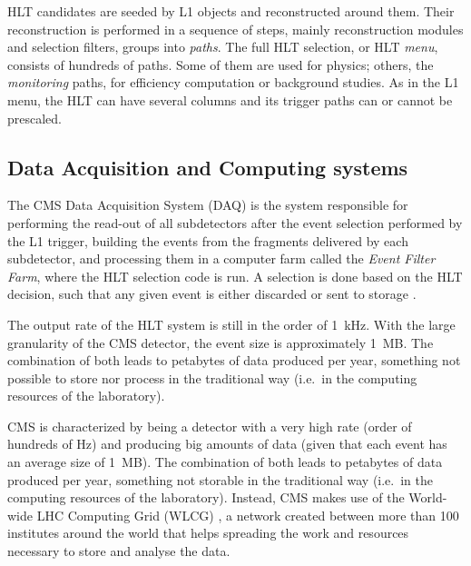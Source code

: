 \documentclass[../main.tex]{subfiles}
\begin{document}
HLT candidates are seeded by L1 objects and reconstructed around them. Their reconstruction is performed in a sequence of steps, mainly reconstruction modules and selection filters, groups into \textit{paths}. The full HLT selection, or HLT \textit{menu}, consists of hundreds of paths. Some of them are used for physics; others, the \textit{monitoring} paths, for efficiency computation or background studies. As in the L1 menu, the HLT can have several columns and its trigger paths can or cannot be prescaled.

\subsection{Data Acquisition and Computing systems}


The CMS Data Acquisition System (DAQ) is the system responsible for performing the read-out of all subdetectors after the event selection performed by the L1 trigger, building the events from the fragments delivered by each subdetector, and processing them in a computer farm called the \textit{Event Filter Farm}, where the HLT selection code is run. A selection is done based on the HLT decision, such that any given event is either discarded or sent to storage \cite{intro:exp:cms}.

The output rate of the HLT system is still in the order of 1~kHz. With the large granularity of the CMS detector, the event size is approximately 1~MB. The combination of both leads to petabytes of data produced per year, something not possible to store nor process in the traditional way (i.e.~in the computing resources of the laboratory).


CMS is characterized by being a detector with a very high rate (order of hundreds of Hz) and producing big amounts of data (given that each event has an average size of 1~MB). The combination of both leads to petabytes of data produced per year, something not storable in the traditional way (i.e.~in the computing resources of the laboratory). Instead, CMS makes use of the World-wide LHC Computing Grid (WLCG) \cite{intro:exp:wlcg_1, intro:exp:wlcg_2}, a network created between more than 100 institutes around the world that helps spreading the work and resources necessary to store and analyse the data.
\end{document}
